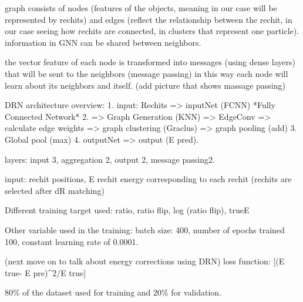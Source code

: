 graph consists of nodes (features of the objects, meaning in our case will be represented by rechits) and edges (reflect the relationship between the rechit, in our case seeing how rechits are connected, in clusters that represent one particle). information in GNN can be shared between neighbors. 

the vector feature of each node is transformed into messages (using dense layers) that will be sent to the neighbors (message passing) in this way each node will learn about its neighbors and itself. (add picture that shows massage passing)


DRN architecture overview: 1. input: Rechits => inputNet (FCNN) *Fully Connected Network* 2. => Graph Generation (KNN) => EdgeConv => calculate edge weights => graph clustering (Graclus) => graph pooling (add) 3. Global pool (max) 4. outputNet => output (E pred).  

layers: input 3, aggregation 2, output 2, message passing2.  

input: rechit positions, E rechit energy corresponding to each rechit (rechits are selected after dR matching)                                                                                                                        

Different training target used: ratio, ratio flip, log (ratio flip), trueE 

Other variable used in the training: batch size: 400, number of epochs trained 100, constant learning rate of 0.0001.  

(next move on to talk about energy corrections using DRN) loss function:  [(E true- E pre)^2/E true] 

80\% of the dataset used for training and 20\% for validation. 
